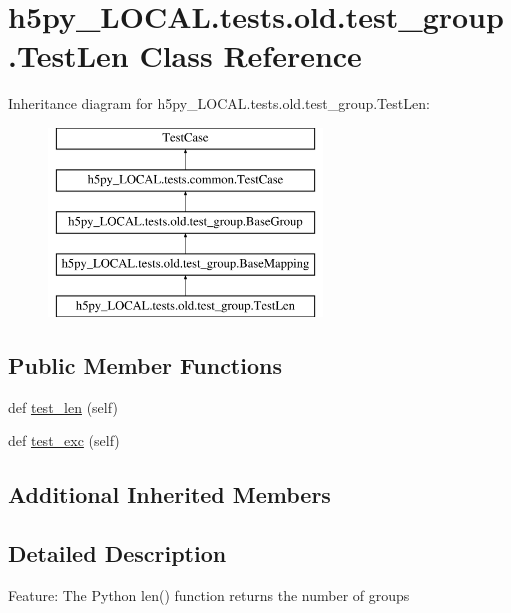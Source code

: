 \hypertarget{classh5py__LOCAL_1_1tests_1_1old_1_1test__group_1_1TestLen}{}\section{h5py\+\_\+\+L\+O\+C\+A\+L.\+tests.\+old.\+test\+\_\+group.\+Test\+Len Class Reference}
\label{classh5py__LOCAL_1_1tests_1_1old_1_1test__group_1_1TestLen}
Inheritance diagram for h5py\+\_\+\+L\+O\+C\+A\+L.\+tests.\+old.\+test\+\_\+group.\+Test\+Len\+:\begin{figure}[H]
\begin{center}
\leavevmode
\includegraphics[height=5.000000cm]{classh5py__LOCAL_1_1tests_1_1old_1_1test__group_1_1TestLen}
\end{center}
\end{figure}
\subsection*{Public Member Functions}
\begin{DoxyCompactItemize}
\item 
def \hyperlink{classh5py__LOCAL_1_1tests_1_1old_1_1test__group_1_1TestLen_a11df0ebdba6ab7426b9ffa338fa9b170}{test\+\_\+len} (self)
\item 
def \hyperlink{classh5py__LOCAL_1_1tests_1_1old_1_1test__group_1_1TestLen_a2fdfc3cd946fd76c7fb5203cfd65b238}{test\+\_\+exc} (self)
\end{DoxyCompactItemize}
\subsection*{Additional Inherited Members}


\subsection{Detailed Description}
\begin{DoxyVerb}    Feature: The Python len() function returns the number of groups
\end{DoxyVerb}
 

